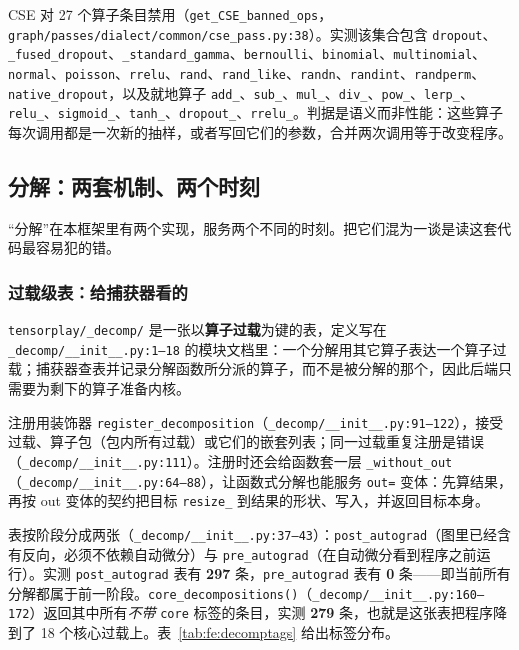 CSE 对 27 个算子条目禁用（\texttt{get\_CSE\_banned\_ops}，\texttt{graph/passes/dialect/common/cse\_pass.py:38}）。实测该集合包含 \texttt{dropout}、\texttt{\_fused\_dropout}、\texttt{\_standard\_gamma}、\texttt{bernoulli}、\texttt{binomial}、\texttt{multinomial}、\texttt{normal}、\texttt{poisson}、\texttt{rrelu}、\texttt{rand}、\texttt{rand\_like}、\texttt{randn}、\texttt{randint}、\texttt{randperm}、\texttt{native\_dropout}，以及就地算子 \texttt{add\_}、\texttt{sub\_}、\texttt{mul\_}、\texttt{div\_}、\texttt{pow\_}、\texttt{lerp\_}、\texttt{relu\_}、\texttt{sigmoid\_}、\texttt{tanh\_}、\texttt{dropout\_}、\texttt{rrelu\_}。判据是语义而非性能：这些算子每次调用都是一次新的抽样，或者写回它们的参数，合并两次调用等于改变程序。

\subsection{分解：两套机制、两个时刻}
\label{sec:fe:decomp}

“分解”在本框架里有两个实现，服务两个不同的时刻。把它们混为一谈是读这套代码最容易犯的错。

\subsubsection{过载级表：给捕获器看的}

\texttt{tensorplay/\_decomp/} 是一张以\textbf{算子过载}为键的表，定义写在 \texttt{\_decomp/\_\_init\_\_.py:1--18} 的模块文档里：一个分解用其它算子表达一个算子过载；捕获器查表并记录分解函数所分派的算子，而不是被分解的那个，因此后端只需要为剩下的算子准备内核。

注册用装饰器 \texttt{register\_decomposition}（\texttt{\_decomp/\_\_init\_\_.py:91--122}），接受过载、算子包（包内所有过载）或它们的嵌套列表；同一过载重复注册是错误（\texttt{\_decomp/\_\_init\_\_.py:111}）。注册时还会给函数套一层 \texttt{\_without\_out}（\texttt{\_decomp/\_\_init\_\_.py:64--88}），让函数式分解也能服务 \texttt{out=} 变体：先算结果，再按 out 变体的契约把目标 \texttt{resize\_} 到结果的形状、写入，并返回目标本身。

表按阶段分成两张（\texttt{\_decomp/\_\_init\_\_.py:37--43}）：\texttt{post\_autograd}（图里已经含有反向，必须不依赖自动微分）与 \texttt{pre\_autograd}（在自动微分看到程序之前运行）。实测 \texttt{post\_autograd} 表有 \textbf{297} 条，\texttt{pre\_autograd} 表有 \textbf{0} 条——即当前所有分解都属于前一阶段。\texttt{core\_decompositions()}（\texttt{\_decomp/\_\_init\_\_.py:160--172}）返回其中所有\emph{不带} \texttt{core} 标签的条目，实测 \textbf{279} 条，也就是这张表把程序降到了 18 个核心过载上。表~\ref{tab:fe:decomptags} 给出标签分布。

